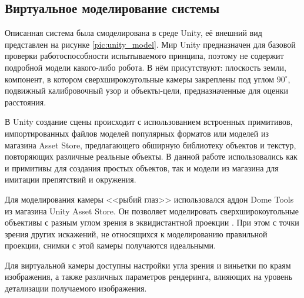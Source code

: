 \subsection{Виртуальное моделирование системы}

Описанная система была смоделирована в среде Unity, её внешний вид представлен на рисунке \ref{pic:unity_model}. Мир 
Unity предназначен для базовой проверки работоспособности испытываемого принципа, поэтому не содержит подробной модели
какого-либо робота. В нём присутствуют: плоскость земли, компонент, в котором сверхширокоугольные камеры закреплены под 
углом $90^\circ$, подвижный калибровочный узор и объекты-цели, предназначенные для оценки расстояния.


В Unity создание сцены происходит с использованием встроенных примитивов, импортированных файлов моделей популярных форматов
или моделей из магазина Asset Store, предлагающего обширную библиотеку объектов и текстур, повторяющих различные реальные объекты. В данной 
работе использовались как и примитивы для создания простых объектов, так и модели из магазина для имитации препятствий и окружения.

Для моделирования камеры <<рыбий глаз>> использовался аддон Dome Tools из магазина Unity Asset Store.    
Он позволяет моделировать сверхширокоугольные объективы с разным углом зрения в эквидистантной проекции \cite{dome_tools}. 
При этом с точки зрения других искажений, не относящихся к моделированию правильной проекции, снимки с этой камеры получаются идеальными. %

Для виртуальной камеры доступны настройки угла зрения и виньетки по краям изображения,  %
а также различных параметров рендеринга, влияющих на уровень  детализации получаемого изображения. 

\vspace{\baselineskip}